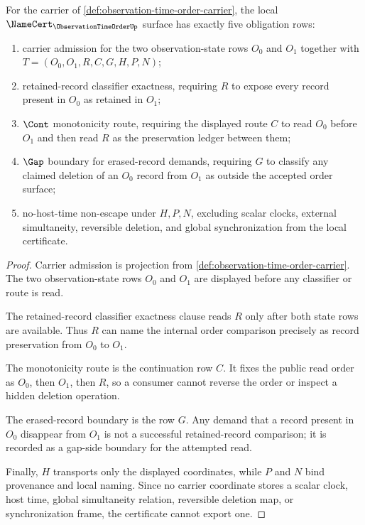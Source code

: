 \begin{theorem}
\label{thm:observation-time-order-namecert-obligations}
For the carrier of \autoref{def:observation-time-order-carrier}, the local $\NameCert_{\ObservationTimeOrderUp}$ surface has exactly five obligation rows:
\begin{enumerate}
\item carrier admission for the two observation-state rows $O_0$ and $O_1$ together with $T=(O_0,O_1,R,C,G,H,P,N)$;
\item retained-record classifier exactness, requiring $R$ to expose every record present in $O_0$ as retained in $O_1$;
\item $\Cont$ monotonicity route, requiring the displayed route $C$ to read $O_0$ before $O_1$ and then read $R$ as the preservation ledger between them;
\item $\Gap$ boundary for erased-record demands, requiring $G$ to classify any claimed deletion of an $O_0$ record from $O_1$ as outside the accepted order surface;
\item no-host-time non-escape under $H,P,N$, excluding scalar clocks, external simultaneity, reversible deletion, and global synchronization from the local certificate.
\end{enumerate}
\end{theorem}
\begin{proof}
Carrier admission is projection from \autoref{def:observation-time-order-carrier}. The two observation-state rows $O_0$ and $O_1$ are displayed before any classifier or route is read.

The retained-record classifier exactness clause reads $R$ only after both state rows are available. Thus $R$ can name the internal order comparison precisely as record preservation from $O_0$ to $O_1$.

The monotonicity route is the continuation row $C$. It fixes the public read order as $O_0$, then $O_1$, then $R$, so a consumer cannot reverse the order or inspect a hidden deletion operation.

The erased-record boundary is the row $G$. Any demand that a record present in $O_0$ disappear from $O_1$ is not a successful retained-record comparison; it is recorded as a gap-side boundary for the attempted read.

Finally, $H$ transports only the displayed coordinates, while $P$ and $N$ bind provenance and local naming. Since no carrier coordinate stores a scalar clock, host time, global simultaneity relation, reversible deletion map, or synchronization frame, the certificate cannot export one.
\end{proof}

